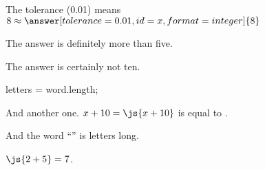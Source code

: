 \documentclass{ximera}
\begin{document}
\begin{problem}
  The tolerance (0.01) means $8 \approx \answer[tolerance=0.01,id=x,format=integer]{8}$
  
  \begin{feedback}
    The answer is definitely more than five.
  \end{feedback}

  \begin{feedback}[x==10]
    The answer is certainly not ten.
  \end{feedback}
\end{problem}

\begin{javascript}
  letters = word.length;
\end{javascript}

And another one.  $x + 10 = \js{x+10}$ is equal to .

And the word ``'' is  letters long.

$\js{2+5} = 7$.
\end{document}
